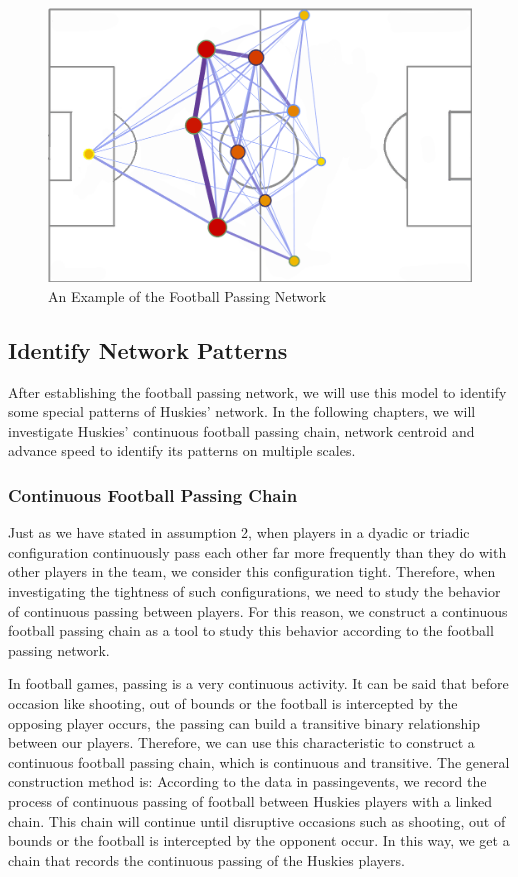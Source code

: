 \documentclass{mcmthesis}
\begin{document}
	\begin{figure}[h]
		\centering
		\includegraphics[width=\textwidth]{figures/playground.png}
		\caption{An Example of the Football Passing Network}
		\label{fig:playground}
	\end{figure}
\subsection{Identify Network Patterns}
	After establishing the football passing network, we will use this model to identify some special patterns of Huskies' network.  In the following chapters, we will investigate Huskies' continuous football passing chain, network centroid and advance speed to identify its patterns on multiple scales. 
\subsubsection{Continuous Football Passing Chain}
	Just as we have stated in assumption 2, when players in a dyadic or triadic configuration continuously pass each other far more frequently than they do with other players in the team, we consider this configuration tight.  Therefore, when investigating the tightness of such configurations, we need to study the behavior of continuous passing between players.  For this reason, we construct a continuous football passing chain as a tool to study this behavior according to the football passing network.

	In football games, passing is a very continuous activity.  It can be said that before occasion like shooting, out of bounds or the football is intercepted by the opposing player occurs, the passing can build a transitive binary relationship between our players.  Therefore, we can use this characteristic to construct a continuous football passing chain, which is continuous and transitive.  The general construction method is: According to the data in passingevents, we record the process of continuous passing of football between Huskies players with a linked chain.  This chain will continue until disruptive occasions such as shooting, out of bounds or the football is intercepted by the opponent occur.  In this way, we get a chain that records the continuous passing of the Huskies players.
\end{document}
